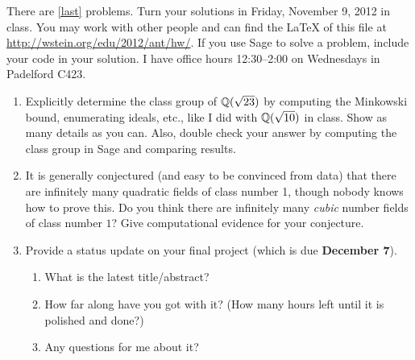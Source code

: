 \documentclass{article}
\title{\dred{Math 581e, Fall 2012, Homework 6}}
\author{William Stein ({\tt wstein@uw.edu})}
\date{Due: Friday, November 9, 2012}
\begin{document}
\maketitle

{\color{dbluecolor}There are \ref{last} problems. Turn your solutions
  in Friday, November 9, 2012 in class.  You may work with other
  people and can find the \LaTeX{} of this file at
  \url{http://wstein.org/edu/2012/ant/hw/}.  If you use Sage to solve
  a problem, include your code in your solution. I have office hours
  12:30--2:00 on Wednesdays in Padelford C423.  }

\begin{enumerate}

\item Explicitly determine the class group of $\mathbb{Q}(\sqrt{23})$ by
  computing the Minkowski bound, enumerating ideals, etc., like I did
  with $\mathbb{Q}(\sqrt{10})$ in class.  Show as many details as you can.
  Also, double check your answer by computing the class group in Sage
  and comparing results.

\item It is generally conjectured (and easy to be convinced from data)
  that there are infinitely many quadratic fields of class number 1,
  though nobody knows how to prove this. Do you think there are
  infinitely many {\em cubic} number fields of class number $1$?  Give
  computational evidence for your conjecture.

\item \label{last} Provide a status update on your final project
  (which is due {\bf December 7}).
\begin{enumerate}
\item What is the latest title/abstract?
\item How far along have you got with it?  (How many hours left until it is polished and done?)
\item Any questions for me about it?
\end{enumerate}

\end{enumerate}
\end{document}
